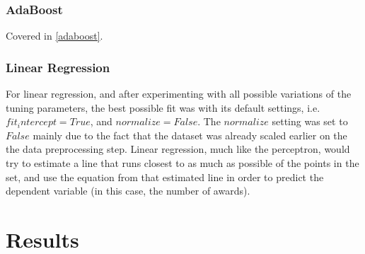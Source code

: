\documentclass[journal,transmag]{IEEEtran}
\begin{document}
			\subsubsection{AdaBoost}
			Covered in \ref{adaboost}.			
			
			\subsubsection{Linear Regression}
			For linear regression, and after experimenting with all possible variations of the tuning parameters, the best possible fit was with its default settings, i.e. $fit_intercept=True$, and $normalize=False$. The $normalize$ setting was set to $False$ mainly due to the fact that the dataset was already scaled earlier on the the data preprocessing step. Linear regression, much like the perceptron, would try to estimate a line that runs closest to as much as possible of the points in the set, and use the equation from that estimated line in order to predict the dependent variable (in this case, the number of awards).
	
	\section{Results}
\end{document}
